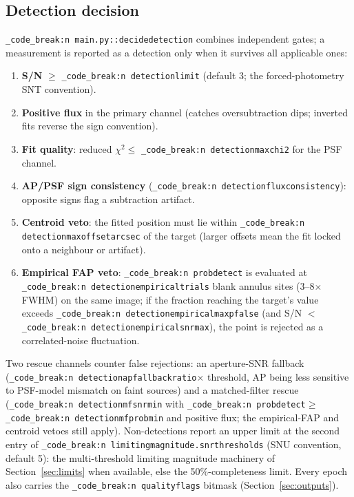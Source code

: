 \documentclass[11pt,a4paper]{article}
\renewcommand{\_}{\autophotunderscore\allowbreak}
\DeclareRobustCommand{\code}[1]{\texttt{\autophot_code_break:n {#1}}}
\begin{document}
\subsection{Detection decision}
\label{sec:detgates}

\code{main.py::\_decide\_detection} combines independent gates; a
measurement is reported as a detection only when it survives all
applicable ones:

\begin{enumerate}[leftmargin=2em,itemsep=0.5pt]
\item \textbf{S/N} $\ge$ \code{detection\_limit} (default 3; the
forced-photometry SNT convention).
\item \textbf{Positive flux} in the primary channel (catches
oversubtraction dips; inverted fits reverse the sign convention).
\item \textbf{Fit quality}: reduced $\chi^2\le$
\code{detection\_max\_chi2} for the PSF channel.
\item \textbf{AP/PSF sign consistency}
(\code{detection\_flux\_consistency}): opposite signs flag a
subtraction artifact.
\item \textbf{Centroid veto}: the fitted position must lie within
\code{detection\_max\_offset\_arcsec} of the target (larger offsets mean
the fit locked onto a neighbour or artifact).
\item \textbf{Empirical FAP veto}: \code{prob\_detect} is evaluated at
\code{detection\_empirical\_trials} blank annulus sites (3--8$\times$FWHM)
on the same image; if the fraction reaching the target's value exceeds
\code{detection\_empirical\_max\_pfalse} (and S/N $<$
\code{detection\_empirical\_snr\_max}), the point is rejected as a
correlated-noise fluctuation.
\end{enumerate}

Two rescue channels counter false rejections: an aperture-SNR fallback
(\code{detection\_ap\_fallback\_ratio}$\times$ threshold, AP being less
sensitive to PSF-model mismatch on faint sources) and a matched-filter
rescue (\code{detection\_mf\_snr\_min} with
\code{prob\_detect}$\ge$\code{detection\_mf\_prob\_min} and positive flux;
the empirical-FAP and centroid vetoes still apply). Non-detections report
an upper limit at the second entry of
\code{limiting\_magnitude.snr\_thresholds} (SNU convention, default 5):
the multi-threshold limiting magnitude machinery of
Section~\ref{sec:limits} when available, else the 50\%-completeness
limit. Every epoch also carries the \code{quality\_flags} bitmask
(Section~\ref{sec:outputs}).
\end{document}
